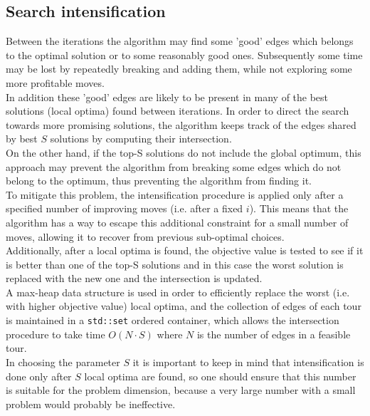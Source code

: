 \subsection{Search intensification}
\label{ssec:intensification}
Between the iterations the algorithm may find some 'good' edges which belongs to the optimal solution or to some reasonably good ones. Subsequently some time may be lost by repeatedly breaking and adding them, while not exploring some more profitable moves. \\
In addition these 'good' edges are likely to be present in many of the best solutions (local optima) found between iterations. In order to direct the search towards more promising solutions, the algorithm keeps track of the edges shared by best $S$ solutions by computing their intersection.\\ 
On the other hand, if the top-S solutions do not include the global optimum, this approach  may prevent the algorithm from breaking some edges which do not belong to the optimum, thus preventing the algorithm from finding it.\\ To mitigate this problem, the intensification procedure is applied only after a specified number of improving moves (i.e. after a fixed $i$). This means that the algorithm has a way to escape this additional constraint for a small number of moves, allowing it to recover from previous sub-optimal choices.\\ 
Additionally, after a local optima is found, the objective value is tested to see if it is better than one of the top-S solutions and in this case the worst solution is replaced with the new one and the intersection is updated.\\
A max-heap data structure is used in order to efficiently replace the worst (i.e. with higher objective value) local optima, and the collection of edges of each tour is maintained in a \texttt{std::set} ordered container, which allows the intersection procedure to take time $O(N\cdot S)$ where $N$ is the number of edges in a feasible tour.\\
In choosing the parameter $S$ it is important to keep in mind that intensification is done only after $S$ local optima are found, so one should ensure that this number is suitable for the problem dimension, because a very large number with a small problem would probably be ineffective.

